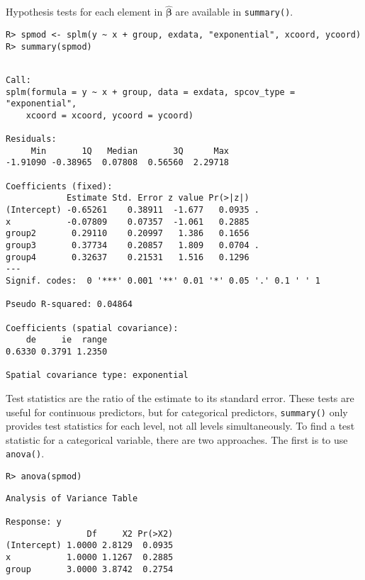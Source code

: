 \documentclass{article}
\begin{document}
Hypothesis tests for each element in \(\hat{\bm{\beta}}\) are available
in \texttt{summary()}.

\begin{verbatim}
R> spmod <- splm(y ~ x + group, exdata, "exponential", xcoord, ycoord)
R> summary(spmod)
\end{verbatim}

\begin{verbatim}

Call:
splm(formula = y ~ x + group, data = exdata, spcov_type = "exponential", 
    xcoord = xcoord, ycoord = ycoord)

Residuals:
     Min       1Q   Median       3Q      Max 
-1.91090 -0.38965  0.07808  0.56560  2.29718 

Coefficients (fixed):
            Estimate Std. Error z value Pr(>|z|)  
(Intercept) -0.65261    0.38911  -1.677   0.0935 .
x           -0.07809    0.07357  -1.061   0.2885  
group2       0.29110    0.20997   1.386   0.1656  
group3       0.37734    0.20857   1.809   0.0704 .
group4       0.32637    0.21531   1.516   0.1296  
---
Signif. codes:  0 '***' 0.001 '**' 0.01 '*' 0.05 '.' 0.1 ' ' 1

Pseudo R-squared: 0.04864

Coefficients (spatial covariance):
    de     ie  range 
0.6330 0.3791 1.2350 

Spatial covariance type: exponential
\end{verbatim}

Test statistics are the ratio of the estimate to its standard error.
These tests are useful for continuous predictors, but for categorical
predictors, \texttt{summary()} only provides test statistics for each
level, not all levels simultaneously. To find a test statistic for a
categorical variable, there are two approaches. The first is to use
\texttt{anova()}.

\begin{verbatim}
R> anova(spmod)
\end{verbatim}

\begin{verbatim}
Analysis of Variance Table

Response: y
                Df     X2 Pr(>X2)
(Intercept) 1.0000 2.8129  0.0935
x           1.0000 1.1267  0.2885
group       3.0000 3.8742  0.2754
\end{verbatim}
\end{document}

